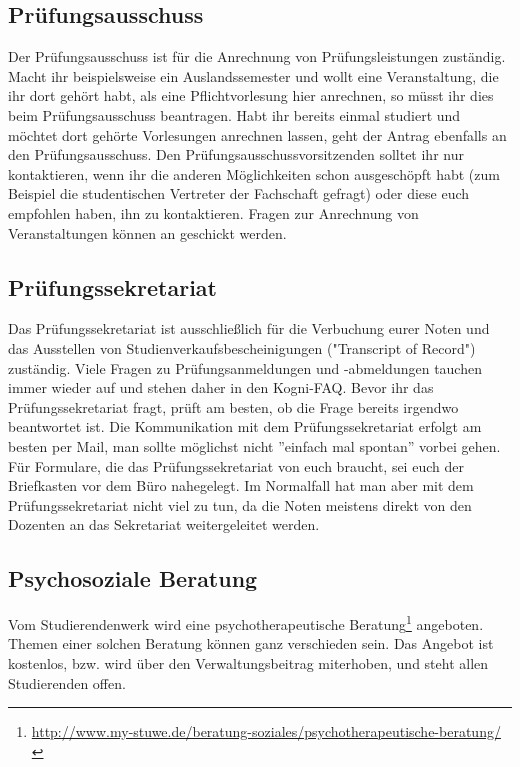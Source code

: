 \subsection*{Prüfungsausschuss} 
Der Prüfungsausschuss ist für die Anrechnung von Prüfungsleistungen zuständig. Macht ihr beispielsweise ein Auslandssemester und wollt eine Veranstaltung, die ihr dort gehört habt, als eine Pflichtvorlesung hier anrechnen, so müsst ihr dies beim Prüfungsausschuss beantragen. Habt ihr bereits einmal studiert und möchtet dort gehörte Vorlesungen anrechnen lassen, geht der Antrag ebenfalls an den Prüfungsausschuss. Den Prüfungsausschussvorsitzenden solltet ihr nur kontaktieren, wenn ihr die anderen Möglichkeiten schon ausgeschöpft habt (zum Beispiel die studentischen Vertreter der Fachschaft gefragt) oder diese euch empfohlen haben, ihn zu kontaktieren. Fragen zur Anrechnung von Veranstaltungen können an  geschickt werden.

\subsection*{Prüfungssekretariat}
Das Prüfungssekretariat ist ausschließlich für die Verbuchung eurer Noten und das Ausstellen von Studienverkaufsbescheinigungen ("Transcript of Record") zuständig. Viele Fragen zu Prüfungsanmeldungen und -abmeldungen tauchen immer wieder auf und stehen daher in den Kogni-FAQ. Bevor ihr das Prüfungssekretariat fragt, prüft am besten, ob die Frage bereits irgendwo beantwortet ist. Die Kommunikation mit dem Prüfungssekretariat erfolgt am besten per Mail, man sollte möglichst nicht ''einfach mal spontan'' vorbei gehen.\\
Für Formulare, die das Prüfungssekretariat von euch braucht, sei euch der Briefkasten vor dem Büro nahegelegt. Im Normalfall hat man aber mit dem Prüfungssekretariat nicht viel zu tun, da die Noten meistens direkt von den Dozenten an das Sekretariat weitergeleitet werden. 

\subsection*{Psychosoziale Beratung}
Vom Studierendenwerk wird eine psychotherapeutische Beratung\footnote{\url{http://www.my-stuwe.de/beratung-soziales/psychotherapeutische-beratung/}} angeboten. Themen einer solchen Beratung können ganz verschieden sein. Das Angebot ist kostenlos, bzw. wird über den Verwaltungsbeitrag miterhoben, und steht allen Studierenden offen.

